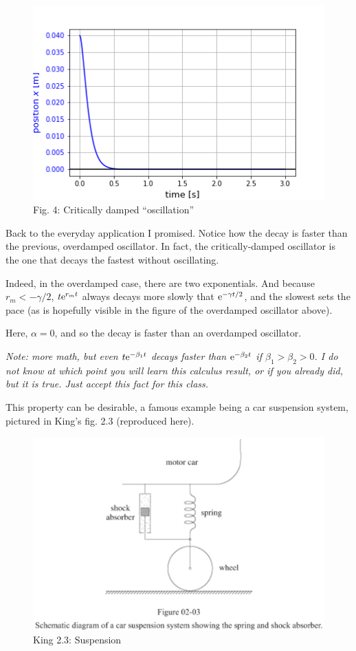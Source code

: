 \documentclass[11pt]{article}
\makeatletter
\def\maxwidth{\ifdim\Gin@nat@width>\linewidth\linewidth
    \else\Gin@nat@width\fi}
\let\Oldincludegraphics\includegraphics
\renewcommand{\includegraphics}[1]{\Oldincludegraphics[width=.8\maxwidth]{#1}}
\makeatother
\begin{document}
    \begin{figure}
\centering
\includegraphics{CriticallyDampedOscillations.png}
\caption{Fig. 4: Critically damped ``oscillation''}
\end{figure}

    Back to the everyday application I promised. Notice how the decay is
faster than the previous, overdamped oscillator. In fact, the
critically-damped oscillator is the one that decays the fastest without
oscillating.

    Indeed, in the overdamped case, there are two exponentials. And because
\(r_m < -\gamma/2\), \(t\textrm{e}^{r_m t}\) always decays more slowly that
\(\textrm{e}^{-\gamma t/2}\), and the slowest sets the pace (as is hopefully
visible in the figure of the overdamped oscillator above).

Here, \(\alpha = 0\), and so the decay is faster than an overdamped
oscillator.

\emph{Note: more math, but even \(t\textrm{e}^{-\beta_1 t}\) decays faster
than \(\textrm{e}^{-\beta_2 t}\) if \(\beta_1 > \beta_2 >0\). I do not know at
which point you will learn this calculus result, or if you already did,
but it is true. Just accept this fact for this class.}

    This property can be desirable, a famous example being a car suspension
system, pictured in King's fig. 2.3 (reproduced here).

\begin{figure}
\centering
\includegraphics{Suspension.png}
\caption{King 2.3: Suspension}
\end{figure}
\end{document}
